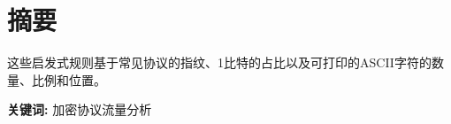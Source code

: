 \section*{摘\hspace*{2em}要} %
这些启发式规则基于常见协议的指纹、1比特的占比以及可打印的ASCII字符的数量、比例和位置。

\vspace{28pt} 

{
\noindent\textbf{关键词:} 加密协议\hspace*{1em}流量分析  
}

\newpage